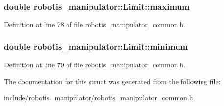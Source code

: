 \subsubsection[{\texorpdfstring{maximum}{maximum}}]{\setlength{\rightskip}{0pt plus 5cm}double robotis\+\_\+manipulator\+::\+Limit\+::maximum}\hypertarget{structrobotis__manipulator_1_1_limit_a82c3d92bd685eb0484fc3ae47f2c3744}{}\label{structrobotis__manipulator_1_1_limit_a82c3d92bd685eb0484fc3ae47f2c3744}


Definition at line 78 of file robotis\+\_\+manipulator\+\_\+common.\+h.

\subsubsection[{\texorpdfstring{minimum}{minimum}}]{\setlength{\rightskip}{0pt plus 5cm}double robotis\+\_\+manipulator\+::\+Limit\+::minimum}\hypertarget{structrobotis__manipulator_1_1_limit_ac32cfcc9a4d06728b518e294a0a6030e}{}\label{structrobotis__manipulator_1_1_limit_ac32cfcc9a4d06728b518e294a0a6030e}


Definition at line 79 of file robotis\+\_\+manipulator\+\_\+common.\+h.



The documentation for this struct was generated from the following file\+:\begin{DoxyCompactItemize}
\item 
include/robotis\+\_\+manipulator/\hyperlink{robotis__manipulator__common_8h}{robotis\+\_\+manipulator\+\_\+common.\+h}\end{DoxyCompactItemize}

